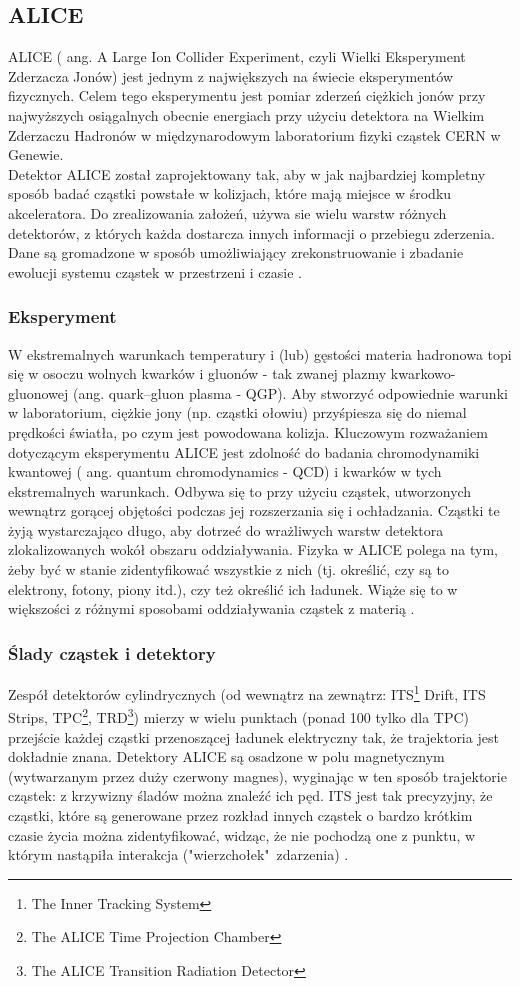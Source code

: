 \subsection{ALICE}
ALICE ( ang. A Large Ion Collider Experiment, czyli Wielki Eksperyment Zderzacza Jonów) jest jednym z największych na świecie eksperymentów fizycznych. Celem tego eksperymentu jest pomiar zderzeń ciężkich jonów przy najwyższych osiągalnych obecnie energiach przy użyciu detektora na Wielkim Zderzaczu Hadronów w międzynarodowym laboratorium fizyki cząstek CERN w Genewie. \\
Detektor ALICE został zaprojektowany tak, aby w jak najbardziej kompletny sposób badać cząstki powstałe w kolizjach, które mają miejsce w środku akceleratora. Do zrealizowania założeń, używa sie wielu warstw różnych detektorów, z których każda dostarcza innych informacji o przebiegu zderzenia. Dane są gromadzone w sposób umożliwiający zrekonstruowanie i zbadanie ewolucji systemu cząstek w przestrzeni i czasie \cite{aliceofficial}. 

\subsubsection{Eksperyment}
W ekstremalnych warunkach temperatury i (lub) gęstości materia hadronowa topi się w osoczu wolnych kwarków i gluonów - tak zwanej plazmy kwarkowo-gluonowej (ang. quark–gluon plasma - QGP). Aby stworzyć odpowiednie warunki w laboratorium, ciężkie jony (np. cząstki ołowiu) przyśpiesza się do niemal prędkości światła, po czym jest powodowana kolizja. Kluczowym rozważaniem dotyczącym eksperymentu ALICE jest zdolność do badania chromodynamiki kwantowej ( ang.  quantum chromodynamics - QCD) i kwarków w tych ekstremalnych warunkach. Odbywa się to przy użyciu cząstek, utworzonych wewnątrz gorącej objętości podczas jej rozszerzania się i ochładzania. Cząstki te żyją wystarczająco długo, aby dotrzeć do wrażliwych warstw detektora zlokalizowanych wokół obszaru oddziaływania. Fizyka w ALICE polega na tym, żeby być w stanie zidentyfikować wszystkie z nich (tj. określić, czy są to elektrony, fotony, piony itd.), czy też określić ich ładunek. Wiąże się to w większości z różnymi sposobami oddziaływania cząstek z materią \cite{aliceexperiment}.

\subsubsection{Ślady cząstek i detektory}
Zespół detektorów cylindrycznych (od wewnątrz na zewnątrz: ITS\footnote{The Inner Tracking System}  Drift, ITS Strips, TPC\footnote{The ALICE Time Projection Chamber}, TRD\footnote{The ALICE Transition Radiation Detector}) mierzy w wielu punktach (ponad 100 tylko dla TPC) przejście każdej cząstki przenoszącej ładunek elektryczny tak, że trajektoria jest dokładnie znana. Detektory ALICE są osadzone w polu magnetycznym (wytwarzanym przez duży czerwony magnes), wyginając w ten sposób trajektorie cząstek: z krzywizny śladów można znaleźć ich pęd. ITS jest tak precyzyjny, że cząstki, które są generowane przez rozkład innych cząstek o bardzo krótkim czasie życia można zidentyfikować, widząc, że nie pochodzą one z punktu, w którym nastąpiła interakcja ("wierzchołek"\ zdarzenia) \cite{trackingparticles}.

